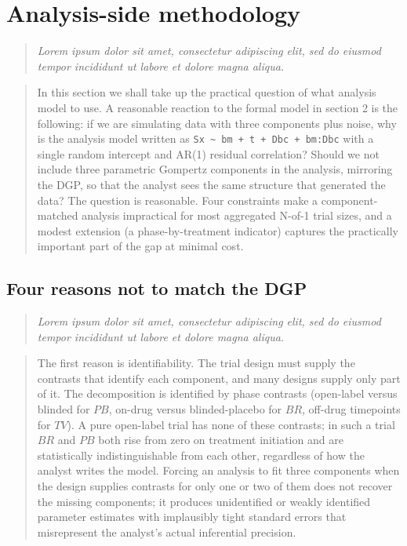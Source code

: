 \documentclass[
  11pt,
]{article}
\newcounter{none} %
\newenvironment{rgt}{%
  \begin{quote}\small\itshape\color[RGB]{20,60,160}}{%
  \end{quote}}
\newenvironment{orig}{%
  \begin{quote}\normalsize\color[gray]{0.55}}{%
  \end{quote}}
\begin{document}
\section{Analysis-side methodology}\label{analysis-side-methodology}

\begin{rgt}
Lorem ipsum dolor sit amet, consectetur adipiscing elit, sed do eiusmod tempor incididunt ut labore et dolore magna aliqua.

\end{rgt}

\begin{orig}
In this section we shall take up the practical question of what
analysis model to use. A reasonable reaction to the formal model
in section 2 is the following: if we are simulating data with
three components plus noise, why is the analysis model written
as \texttt{Sx \textasciitilde\ bm + t + Dbc + bm:Dbc} with a
single random intercept and AR(1) residual correlation? Should
we not include three parametric Gompertz components in the
analysis, mirroring the DGP, so that the analyst sees the same
structure that generated the data? The question is reasonable.
Four constraints make a component-matched analysis impractical
for most aggregated N-of-1 trial sizes, and a modest extension
(a phase-by-treatment indicator) captures the practically
important part of the gap at minimal cost.

\end{orig}

\subsection{Four reasons not to match the DGP}\label{four-reasons-not-to-match-the-dgp}

\begin{rgt}
Lorem ipsum dolor sit amet, consectetur adipiscing elit, sed do eiusmod tempor incididunt ut labore et dolore magna aliqua.

\end{rgt}

\begin{orig}
The first reason is identifiability. The trial design must
supply the contrasts that identify each component, and many
designs supply only part of it. The decomposition is identified
by phase contrasts (open-label versus blinded for \(PB\), on-drug
versus blinded-placebo for \(BR\), off-drug timepoints for \(TV\)).
A pure open-label trial has none of these contrasts; in such a
trial \(BR\) and \(PB\) both rise from zero on treatment initiation
and are statistically indistinguishable from each other,
regardless of how the analyst writes the model. Forcing an
analysis to fit three components when the design supplies
contrasts for only one or two of them does not recover the
missing components; it produces unidentified or weakly
identified parameter estimates with implausibly tight standard
errors that misrepresent the analyst's actual inferential
precision.

\end{orig}
\end{document}
